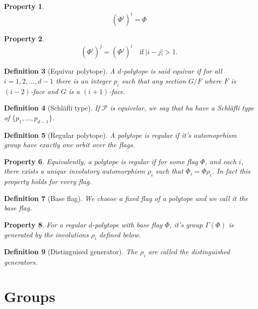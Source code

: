 \documentclass[a4paper]{article}
\theoremstyle{mytheorem}
\newtheorem{definition}{Definition}[section]
\newtheorem{property}[definition]{Property}
\begin{document}
\begin{property}
  \[
    \left(\Phi^i\right)^i = \Phi
  \]
\end{property}

\begin{property}
  \[
    \left(\Phi^i\right)^j = \left(\Phi^j\right)^i \quad \text{if} \ |i-j| > 1.
  \]
\end{property}

\begin{definition}[Equivar polytope]
  A $d$-polytope is said \textit{equivar} if for all $i = 1, 2, \dots, d-1$ there is an integer $p_i$ such that any section $G/F$ where $F$ is $(i-2)$-face and $G$ is a $(i+1)$-face.
\end{definition}

\begin{definition}[Schläfli type]
  If $\mathcal P$ is equivelar, we say that ha have a \textit{Schläfli type} of $\{p_1, \dots, p_{d-1}\}$.
\end{definition}

\begin{definition}[Regular polytope]
  A polytope is regular if it's automoprhism group have exactly one orbit over the flags.
\end{definition}

\begin{property}
  Equivalently, a polytope is regular if for some flag $\Phi$, and each $i$, there exists a unique involutory automorphism $\rho_i$ such that $\Phi_i = \Phi \rho_i$. In fact this property holds for every flag.
\end{property}

\begin{definition}[Base flag]
  We choose a fixed flag of a polytope and we call it the \textit{base flag}.
\end{definition}

\begin{property}
  For a regular $d$-polytope with base flag $\Phi$, it's group $\Gamma(\Phi)$ is generated by the involutions $\rho_i$ defined below.
\end{property}

\begin{definition}[Distinguised generator]
  The $\rho_i$ are called the \textit{distinguished generators}.
\end{definition}

\section{Groups}
\end{document}
